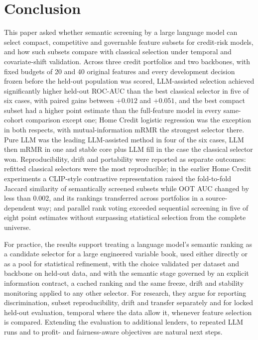 \documentclass[final,5p,twocolumn]{elsarticle}
\begin{document}

\section{Conclusion}
\label{sec:conclusion}

This paper asked whether semantic screening by a large language model can select compact, competitive and governable feature subsets for credit-risk models, and how such subsets compare with classical selection under temporal and covariate-shift validation. Across three credit portfolios and two backbones, with fixed budgets of 20 and 40 original features and every development decision frozen before the held-out population was scored, LLM-assisted selection achieved significantly higher held-out ROC-AUC than the best classical selector in five of six cases, with paired gains between $+0.012$ and $+0.051$, and the best compact subset had a higher point estimate than the full-feature model in every same-cohort comparison except one; Home Credit logistic regression was the exception in both respects, with mutual-information mRMR the strongest selector there. Pure LLM was the leading LLM-assisted method in four of the six cases, LLM then mRMR in one and stable core plus LLM fill in the case the classical selector won. Reproducibility, drift and portability were reported as separate outcomes: refitted classical selectors were the most reproducible; in the earlier Home Credit experiments a CLIP-style contrastive representation raised the fold-to-fold Jaccard similarity of semantically screened subsets while OOT AUC changed by less than 0.002, and its rankings transferred across portfolios in a source-dependent way; and parallel rank voting exceeded sequential screening in five of eight point estimates without surpassing statistical selection from the complete universe.

For practice, the results support treating a language model's semantic ranking as a candidate selector for a large engineered variable book, used either directly or as a pool for statistical refinement, with the choice validated per dataset and backbone on held-out data, and with the semantic stage governed by an explicit information contract, a cached ranking and the same freeze, drift and stability monitoring applied to any other selector. For research, they argue for reporting discrimination, subset reproducibility, drift and transfer separately and for locked held-out evaluation, temporal where the data allow it, whenever feature selection is compared. Extending the evaluation to additional lenders, to repeated LLM runs and to profit- and fairness-aware objectives are natural next steps.
\end{document}
